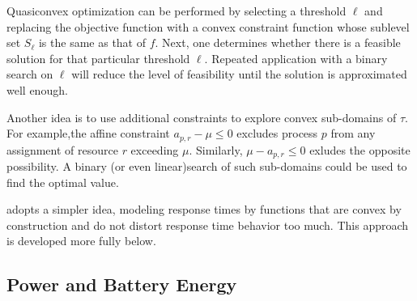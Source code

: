 Quasiconvex optimization can be performed by selecting a threshold $\ell$ and replacing the objective function
with a convex constraint function whose sublevel set $S_\ell$ is the same as that of $f$.
Next, one determines whether there is a feasible solution for that particular threshold $\ell$.
Repeated application with a binary search on $\ell$ will reduce the level of feasibility
until the solution is approximated well enough.

Another idea is to use additional constraints to explore convex sub-domains of $\tau$.
For example,the affine constraint $a_{p,r} - \mu \leq 0$ excludes process $p$ from any assignment of resource $r$ exceeding $\mu$.  Similarly, $\mu - a_{p,r} \leq 0$ exludes the opposite possibility.
A binary (or even linear)search of such sub-domains could be used to find the optimal value.

\pacora adopts a simpler idea, modeling response times by functions that are convex by construction
and do not distort response time behavior too much.  This approach is developed more fully below.



\subsection*{Power and Battery Energy}
